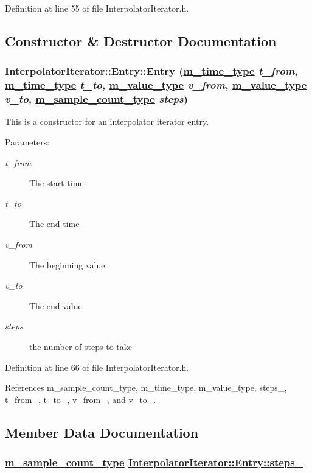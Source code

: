 Definition at line 55 of file Interpolator\-Iterator.h.

\subsection{Constructor \& Destructor Documentation}
\hypertarget{classInterpolatorIterator_1_1Entry_a0}{
\subsubsection[Entry]{\setlength{\rightskip}{0pt plus 5cm}Interpolator\-Iterator::Entry::Entry (\hyperlink{Types_8h_a2}{m\_\-time\_\-type} {\em t\_\-from}, \hyperlink{Types_8h_a2}{m\_\-time\_\-type} {\em t\_\-to}, \hyperlink{Types_8h_a3}{m\_\-value\_\-type} {\em v\_\-from}, \hyperlink{Types_8h_a3}{m\_\-value\_\-type} {\em v\_\-to}, \hyperlink{Types_8h_a1}{m\_\-sample\_\-count\_\-type} {\em steps})}}
\label{classInterpolatorIterator_1_1Entry_a0}


This is a constructor for an interpolator iterator entry. \begin{Desc}
\item[Parameters:]
\begin{description}
\item[{\em t\_\-from}]The start time \item[{\em t\_\-to}]The end time \item[{\em v\_\-from}]The beginning value \item[{\em v\_\-to}]The end value \item[{\em steps}]the number of steps to take \end{description}
\end{Desc}


Definition at line 66 of file Interpolator\-Iterator.h.

References m\_\-sample\_\-count\_\-type, m\_\-time\_\-type, m\_\-value\_\-type, steps\_\-, t\_\-from\_\-, t\_\-to\_\-, v\_\-from\_\-, and v\_\-to\_\-.

\subsection{Member Data Documentation}
\hypertarget{classInterpolatorIterator_1_1Entry_o4}{
\subsubsection[steps\_\-]{\setlength{\rightskip}{0pt plus 5cm}\hyperlink{Types_8h_a1}{m\_\-sample\_\-count\_\-type} \hyperlink{classInterpolatorIterator_1_1Entry_o4}{Interpolator\-Iterator::Entry::steps\_\-}}}
\label{classInterpolatorIterator_1_1Entry_o4}


